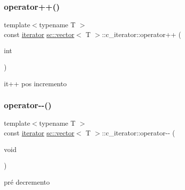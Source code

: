 \subsubsection{\texorpdfstring{operator++()}{operator++()}\hspace{0.1cm}{\footnotesize\ttfamily [2/2]}}
{\footnotesize\ttfamily template$<$typename T $>$ \\
const \hyperlink{classsc_1_1vector_1_1iterator}{iterator} \hyperlink{classsc_1_1vector}{sc\+::vector}$<$ T $>$\+::c\+\_\+iterator\+::operator++ (\begin{DoxyParamCaption}\item[{int}]{ }\end{DoxyParamCaption})\hspace{0.3cm}{\ttfamily [inline]}}



it++ pos incremento 

\mbox{\label{classsc_1_1vector_1_1c__iterator_a4ae80e4a75b12f8ae8cac34f4b57b83e}} 
\subsubsection{\texorpdfstring{operator-\/-\/()}{operator--()}\hspace{0.1cm}{\footnotesize\ttfamily [1/2]}}
{\footnotesize\ttfamily template$<$typename T $>$ \\
const \hyperlink{classsc_1_1vector_1_1iterator}{iterator} \hyperlink{classsc_1_1vector}{sc\+::vector}$<$ T $>$\+::c\+\_\+iterator\+::operator-\/-\/ (\begin{DoxyParamCaption}\item[{void}]{ }\end{DoxyParamCaption})\hspace{0.3cm}{\ttfamily [inline]}}



pré decremento 

\mbox{\label{classsc_1_1vector_1_1c__iterator_a02b8cdb8cc3aa103f568189704748935}} 
